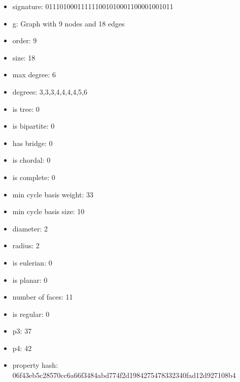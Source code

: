 \newpage
\begin{figure}
\end{figure}
\begin{itemize}
\item signature: 011101000111111001010001100001001011
\item g: Graph with 9 nodes and 18 edges
\item order: 9
\item size: 18
\item max degree: 6
\item degrees: 3,3,3,4,4,4,4,5,6
\item is tree: 0
\item is bipartite: 0
\item has bridge: 0
\item is chordal: 0
\item is complete: 0
\item min cycle basis weight: 33
\item min cycle basis size: 10
\item diameter: 2
\item radius: 2
\item is eulerian: 0
\item is planar: 0
\item number of faces: 11
\item is regular: 0
\item p3: 37
\item p4: 42
\item property hash: 06f43eb5c28570cc6a66f3484abd774f2d1984275478332340fad12d927108b4
\end{itemize}
